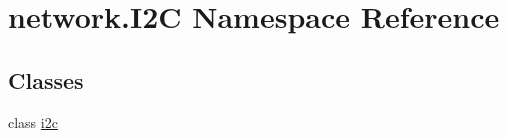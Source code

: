 \hypertarget{namespacenetwork_1_1I2C}{}\section{network.\+I2\+C Namespace Reference}
\label{namespacenetwork_1_1I2C}
\subsection*{Classes}
\begin{DoxyCompactItemize}
\item 
class \hyperlink{classnetwork_1_1I2C_1_1i2c}{i2c}
\end{DoxyCompactItemize}
